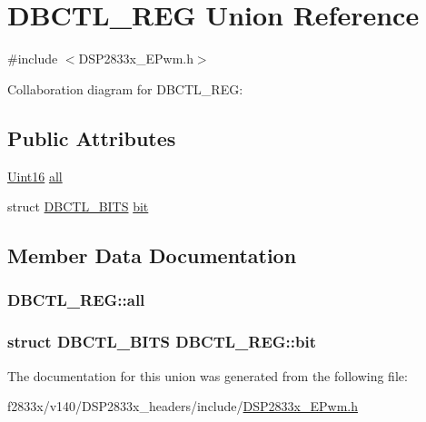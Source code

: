 \hypertarget{union_d_b_c_t_l___r_e_g}{}\section{D\+B\+C\+T\+L\+\_\+\+R\+E\+G Union Reference}
\label{union_d_b_c_t_l___r_e_g}


{\ttfamily \#include $<$D\+S\+P2833x\+\_\+\+E\+Pwm.\+h$>$}



Collaboration diagram for D\+B\+C\+T\+L\+\_\+\+R\+E\+G\+:
\subsection*{Public Attributes}
\begin{DoxyCompactItemize}
\item 
\hyperlink{_d_s_p2833x___device_8h_a59a9f6be4562c327cbfb4f7e8e18f08b}{Uint16} \hyperlink{union_d_b_c_t_l___r_e_g_ac738982a5f65e93795c02c02456dd32e}{all}
\item 
struct \hyperlink{struct_d_b_c_t_l___b_i_t_s}{D\+B\+C\+T\+L\+\_\+\+B\+I\+T\+S} \hyperlink{union_d_b_c_t_l___r_e_g_a24003f017dfbe56d95aabe91886a7cca}{bit}
\end{DoxyCompactItemize}


\subsection{Member Data Documentation}
\hypertarget{union_d_b_c_t_l___r_e_g_ac738982a5f65e93795c02c02456dd32e}{}
\subsubsection[{all}]{ D\+B\+C\+T\+L\+\_\+\+R\+E\+G\+::all}\label{union_d_b_c_t_l___r_e_g_ac738982a5f65e93795c02c02456dd32e}
\hypertarget{union_d_b_c_t_l___r_e_g_a24003f017dfbe56d95aabe91886a7cca}{}
\subsubsection[{bit}]{\setlength{\rightskip}{0pt plus 5cm}struct {\bf D\+B\+C\+T\+L\+\_\+\+B\+I\+T\+S} D\+B\+C\+T\+L\+\_\+\+R\+E\+G\+::bit}\label{union_d_b_c_t_l___r_e_g_a24003f017dfbe56d95aabe91886a7cca}


The documentation for this union was generated from the following file\+:\begin{DoxyCompactItemize}
\item 
f2833x/v140/\+D\+S\+P2833x\+\_\+headers/include/\hyperlink{_d_s_p2833x___e_pwm_8h}{D\+S\+P2833x\+\_\+\+E\+Pwm.\+h}\end{DoxyCompactItemize}
